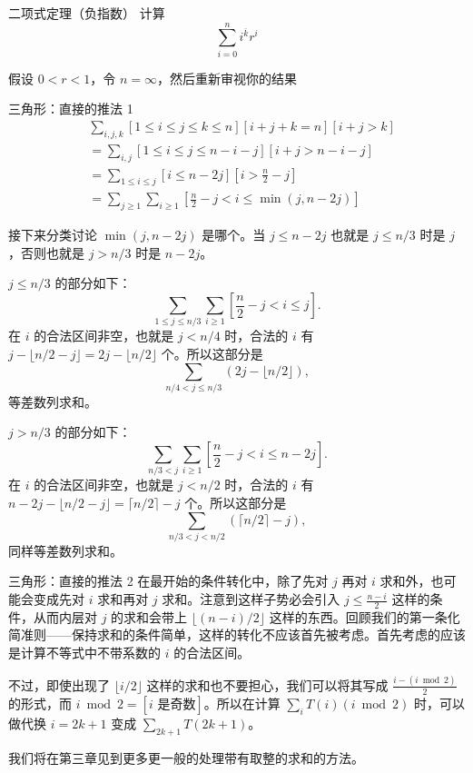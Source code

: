 \begin{frame}{二项式定理（负指数）}
    计算
    $$
    \sum_{i=0}^ni^{\overline{k}}r^i
    $$

    假设 $0<r<1$，令 $n=\infty$，然后重新审视你的结果
\end{frame}
\begin{frame}{三角形：直接的推法 1}
    $$
    \begin{aligned}
        &\sum_{i,j,k}[1\le i\le j\le k\le n][i+j+k=n][i+j>k]\\
        &=\sum_{i,j}[1\le i\le j\le n-i-j][i+j>n-i-j]\\
        &=\sum_{1\le i\le j}[i\le n-2j][i>\frac{n}{2}-j]\\
        &=\sum_{j\ge 1}\sum_{i\ge 1}[\frac{n}{2}-j<i\le \min(j,n-2j)]
    \end{aligned}
    $$

    接下来分类讨论 $\min(j,n-2j)$ 是哪个。当 $j\le n-2j$ 也就是 $j\le n/3$ 时是 $j$，否则也就是 $j>n/3$ 时是 $n-2j$。
\end{frame}
\begin{frame}
    $j\le n/3$ 的部分如下：
    $$
    \sum_{1\le j\le n/3}\sum_{i\ge 1}[\frac{n}{2}-j<i\le j].
    $$
    在 $i$ 的合法区间非空，也就是 $j<n/4$ 时，合法的 $i$ 有 $j-\lfloor n/2-j\rfloor=2j-\lfloor n/2\rfloor$ 个。所以这部分是
    $$
    \sum_{n/4<j\le n/3}(2j-\lfloor n/2\rfloor),
    $$
    等差数列求和。
\end{frame}
\begin{frame}
    $j>n/3$ 的部分如下：
    $$
    \sum_{n/3<j}\sum_{i\ge 1}[\frac{n}{2}-j<i\le n-2j].
    $$
    在 $i$ 的合法区间非空，也就是 $j<n/2$ 时，合法的 $i$ 有 $n-2j-\lfloor n/2-j\rfloor=\lceil n/2\rceil-j$ 个。所以这部分是
    $$
    \sum_{n/3<j<n/2}(\lceil n/2\rceil-j),
    $$
    同样等差数列求和。
\end{frame}
\begin{frame}{三角形：直接的推法 2}
    在最开始的条件转化中，除了先对 $j$ 再对 $i$ 求和外，也可能会变成先对 $i$ 求和再对 $j$ 求和。注意到这样子势必会引入 $j\le\frac{n-i}{2}$ 这样的条件，从而内层对 $j$ 的求和会带上 $\lfloor (n-i)/2\rfloor$ 这样的东西。回顾我们的第一条化简准则——保持求和的条件简单，这样的转化不应该首先被考虑。首先考虑的应该是计算不等式中不带系数的 $i$ 的合法区间。
    
    不过，即使出现了 $\lfloor i/2\rfloor$ 这样的求和也不要担心，我们可以将其写成 $\frac{i-(i\bmod 2)}{2}$ 的形式，而 $i\bmod 2=[i\text{ 是奇数}]$。所以在计算 $\sum_{i} T(i)(i\bmod 2)$ 时，可以做代换 $i=2k+1$ 变成 $\sum_{2k+1}T(2k+1)$。

    我们将在第三章见到更多更一般的处理带有取整的求和的方法。
\end{frame}
